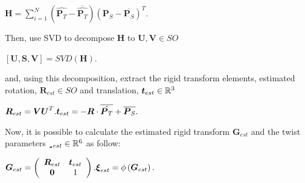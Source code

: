 \begin{itemize}
  $ \boldsymbol {H}= \sum ^{N}_{i=1}\left(\hat{\boldsymbol {P}_T}-\overline{\hat{\boldsymbol {P}_T}}\right)\left(\boldsymbol {P}_S-\overline{\boldsymbol {P}_S}\right)^{T}.$

  Then, use SVD to decompose $\boldsymbol{H}$ to
  $\boldsymbol{U},\boldsymbol{V} \in SO$

  $  [\boldsymbol {U}, \boldsymbol {S}, \boldsymbol {V}]= SVD (\boldsymbol {H}).$

  and, using this decomposition, extract the rigid transform elements,
  estimated rotation, $\boldsymbol{R}_{est}\in SO$ and translation,
  $\boldsymbol{t}_{est} \in \mathbb{R}^3$

  $ \boldsymbol {R}_{est} = \boldsymbol {V}\boldsymbol {U}^{T}.\\\boldsymbol {t}_{est} = - \boldsymbol {R}\cdot \overline{\hat{\boldsymbol {P}_T}} + \overline{\boldsymbol {P}_S}. $

  Now, it is possible to calculate the estimated rigid transform
  $\mathbf{G}_{est}$ and the twist parameters
  $\mathbf{\xi}_{est} \in \mathbb{R}^{6}$ as follow:

  $ \boldsymbol {G}_{est} = \left(\begin{array}{cc}\boldsymbol {R}_{est} & \boldsymbol {t}_{est} \\ \boldsymbol {0} & 1 \end{array} \right). \\ \boldsymbol {\xi }_{est} = \phi \left(\boldsymbol {G}_{est} \right). $
\end{itemize}

